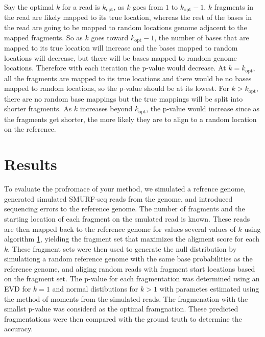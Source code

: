 Say the optimal $k$ for a read is $k_\mathrm{opt}$, as $k$ goes from $1$
to $k_\mathrm{opt}-1$, $k$ fragments in the read are likely mapped to
its true location, whereas the rest of the bases in the read are going
to be mapped to random locations genome adjacent to the mapped
fragments. So as $k$ goes toward $k_\mathrm{opt}-1$, the number of bases
that are mapped to its true location will increase and the bases mapped
to random locations will decrease, but there will be bases mapped to
random genome locations. Therefore with each iteration the p-value
would decrease. At $k=k_\mathrm{opt}$, all the fragments are mapped to
its true locations and there would be no bases mapped to random
locations, so the p-value should be at its lowest. For $k >
k_\mathrm{opt}$, there are no random base mappings but the true mappings
will be split into shorter fragments. As $k$ increases beyond
$k_\mathrm{opt}$, the p-value would increase since as the fragments get
shorter, the more likely they are to align to a random location on the
reference.


\section{Results}
To evaluate the profromace of your method, we simulated a refrence
genome, generated simulated SMURF-seq reads from the genome, and
introduced sequencing errors to the reference genome. The number of
fragments and the starting location of each fragment on the smulated 
read is known. These reads are then mapped back to the reference genome
for values several values of $k$ using algorithm \ref{}, yielding the 
fragment set that maximizes the aligment score for each $k$. These
fragment sets were then used to generate the null distribution by
simulationg a random reference genome with the same base probabilities
as the reference genome, and aliging random reads with fragment start
locations based on the fragment set. The p-value for each fragmentation
was determined using an EVD for $k=1$ and normal distibutions for $k >
1$ with parametes estimated using the method of moments from the
simulated reads. The fragmenation with the smallst p-value was considerd
as the optimal framgnation. These predicted fragmentations were then
compared with the ground truth to determine the accuracy.  

